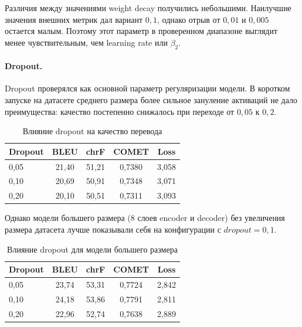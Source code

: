 Различия между значениями weight decay получились небольшими. Наилучшие значения внешних метрик дал вариант $0{,}1$, однако отрыв от $0{,}01$ и $0{,}005$ остается малым. Поэтому этот параметр в проверенном диапазоне выглядит менее чувствительным, чем learning rate или $\beta_2$.

\paragraph{Dropout.}
Dropout проверялся как основной параметр регуляризации модели.
В коротком запуске на датасете среднего размера более сильное зануление активаций не дало преимущества: качество постепенно снижалось при переходе от $0{,}05$ к $0{,}2$.

\begin{table}[H]
	\centering
	\caption{Влияние dropout на качество перевода}
	\label{tab:dropout-comparison}
	\begin{tabular}{|p{}|c|c|c|c|}
		\hline
		\textbf{Dropout} & \textbf{BLEU} & \textbf{chrF} & \textbf{COMET} & \textbf{Loss} \\
		\hline
		0{,}05           & 21{,}40       & 51{,}21       & 0{,}7380       & 3{,}058       \\
		\hline
		0{,}10           & 20{,}69       & 50{,}91       & 0{,}7348       & 3{,}071       \\
		\hline
		0{,}20           & 20{,}10       & 50{,}51       & 0{,}7311       & 3{,}093       \\
		\hline
	\end{tabular}
\end{table}

Однако модели большего размера ($8$ слоев encoder и decoder) без увеличения размера датасета лучше показывали себя на конфигурации с $dropout = 0{,}1$.

\begin{table}[H]
	\centering
	\caption{Влияние dropout для модели большего размера}
	\label{tab:dropout-large-model-comparison}
	\begin{tabular}{|p{}|c|c|c|c|}
		\hline
		\textbf{Dropout} & \textbf{BLEU} & \textbf{chrF} & \textbf{COMET} & \textbf{Loss} \\
		\hline
		0{,}05           & 23{,}74       & 53{,}31       & 0{,}7724       & 2{,}842       \\
		\hline
		0{,}10           & 24{,}18       & 53{,}86       & 0{,}7791       & 2{,}811       \\
		\hline
		0{,}20           & 22{,}96       & 52{,}74       & 0{,}7638       & 2{,}889       \\
		\hline
	\end{tabular}
\end{table}

